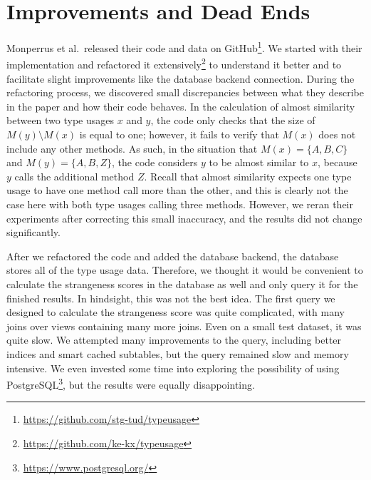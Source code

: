 \section{Improvements and Dead Ends}\label{sec:deadends}


Monperrus et al.\ released their code and data on GitHub\footnote{\url{https://github.com/stg-tud/typeusage}}.
We started with their implementation and refactored it extensively\footnote{\url{https://github.com/ke-kx/typeusage}} to understand it better and to facilitate slight improvements like the database backend connection.
During the refactoring process, we discovered small discrepancies between what they describe in the paper and how their code behaves.
In the calculation of almost similarity between two type usages $x$ and $y$, the code only checks that the size of $M(y) \setminus M(x)$ is equal to one; however, it fails to verify that $M(x)$ does not include any other methods.
As such, in the situation that $M(x) =\{A, B, C\}$ and $M(y) = \{A, B, Z\}$, the code considers $y$ to be almost similar to $x$, because $y$ calls the additional method $Z$.
Recall that almost similarity expects one type usage to have one method call more than the other, and this is clearly not the case here with both type usages calling three methods.
However, we reran their experiments after correcting this small inaccuracy, and the results did not change significantly.

After we refactored the code and added the database backend, the database stores all of the type usage data.
Therefore, we thought it would be convenient to calculate the strangeness scores in the database as well and only query it for the finished results.
In hindsight, this was not the best idea.
The first query we designed to calculate the strangeness score was quite complicated, with many joins over views containing many more joins.
Even on a small test dataset, it was quite slow.
We attempted many improvements to the query, including better indices and smart cached subtables, but the query remained slow and memory intensive.
We even invested some time into exploring the possibility of using PostgreSQL\footnote{\url{https://www.postgresql.org/}}, but the results were equally disappointing.

